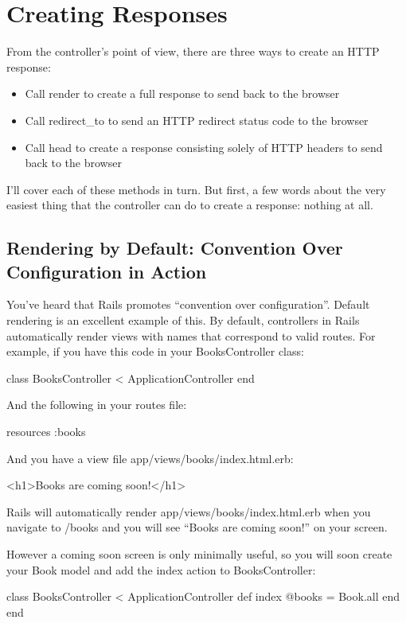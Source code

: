 \documentclass[10pt]{book}
\newenvironment{code}{%
  \scriptsize
    \verbatim
}{%
    \endverbatim
    \newline
}
\begin{document}
\section{ Creating Responses}

From the controller’s point of view, there are three ways to create an HTTP response:
\begin{itemize}
	\item Call render to create a full response to send back to the browser
	\item Call redirect\_to to send an HTTP redirect status code to the browser
	\item Call head to create a response consisting solely of HTTP headers to send back to the browser
\end{itemize}

I’ll cover each of these methods in turn. But first, a few words  about the very easiest thing that the controller can do to create a  response: nothing at all.

\subsection{ Rendering by Default: Convention Over Configuration in Action}

You’ve heard that Rails promotes “convention over configuration”.  Default rendering is an excellent example of this. By default,  controllers in Rails automatically render views with names that  correspond to valid routes. For example, if you have this code in your BooksController class:
\begin{code}
class BooksController < ApplicationController
end
\end{code}

And the following in your routes file:
\begin{code}
resources :books
\end{code}

And you have a view file app/views/books/index.html.erb:
\begin{code}
<h1>Books are coming soon!</h1>
\end{code}

Rails will automatically render app/views/books/index.html.erb when you navigate to /books and you will see “Books are coming soon!” on your screen.

However a coming soon screen is only minimally useful, so you will soon create your Book model and add the index action to BooksController:
\begin{code}
class BooksController < ApplicationController
  def index
    @books = Book.all
  end
end
\end{code}
\end{document}
